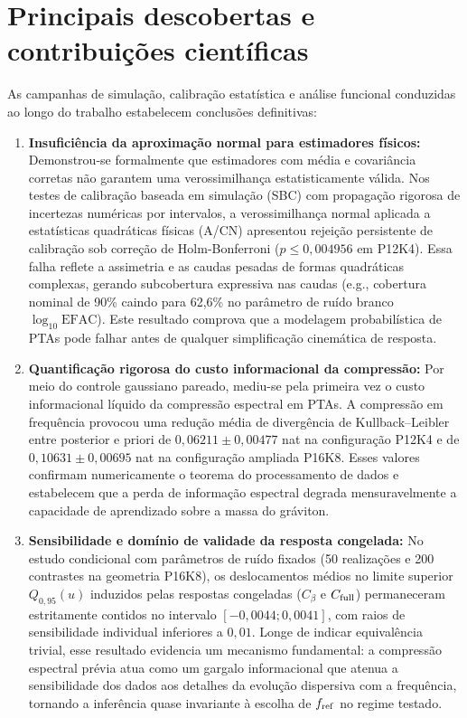 \section{Principais descobertas e contribuições científicas}

As campanhas de simulação, calibração estatística e análise funcional conduzidas ao longo do trabalho estabelecem conclusões definitivas:

\begin{enumerate}
  \item \textbf{Insuficiência da aproximação normal para estimadores físicos:} 
  Demonstrou-se formalmente que estimadores com média e covariância corretas não garantem uma verossimilhança estatisticamente válida. Nos testes de calibração baseada em simulação (SBC) com propagação rigorosa de incertezas numéricas por intervalos, a verossimilhança normal aplicada a estatísticas quadráticas físicas (A/CN) apresentou rejeição persistente de calibração sob correção de Holm-Bonferroni ($p \le 0{,}004956$ em P12K4). Essa falha reflete a assimetria e as caudas pesadas de formas quadráticas complexas, gerando subcobertura expressiva nas caudas (e.g., cobertura nominal de 90\% caindo para 62,6\% no parâmetro de ruído branco $\log_{10}\mathrm{EFAC}$). Este resultado comprova que a modelagem probabilística de PTAs pode falhar antes de qualquer simplificação cinemática de resposta.

  \item \textbf{Quantificação rigorosa do custo informacional da compressão:} 
  Por meio do controle gaussiano pareado, mediu-se pela primeira vez o custo informacional líquido da compressão espectral em PTAs. A compressão em frequência provocou uma redução média de divergência de Kullback--Leibler entre posterior e priori de $0{,}06211 \pm 0{,}00477$ nat na configuração P12K4 e de $0{,}10631 \pm 0{,}00695$ nat na configuração ampliada P16K8. Esses valores confirmam numericamente o teorema do processamento de dados e estabelecem que a perda de informação espectral degrada mensuravelmente a capacidade de aprendizado sobre a massa do gráviton.

  \item \textbf{Sensibilidade e domínio de validade da resposta congelada:} 
  No estudo condicional com parâmetros de ruído fixados (50 realizações e 200 contrastes na geometria P16K8), os deslocamentos médios no limite superior $Q_{0{,}95}(u)$ induzidos pelas respostas congeladas ($C_\beta$ e $C_{\rm full}$) permaneceram estritamente contidos no intervalo $[-0{,}0044; 0{,}0041]$, com raios de sensibilidade individual inferiores a $0{,}01$. Longe de indicar equivalência trivial, esse resultado evidencia um mecanismo fundamental: a compressão espectral prévia atua como um gargalo informacional que atenua a sensibilidade dos dados aos detalhes da evolução dispersiva com a frequência, tornando a inferência quase invariante à escolha de $f_{\rm ref}$ no regime testado.


\end{enumerate}
